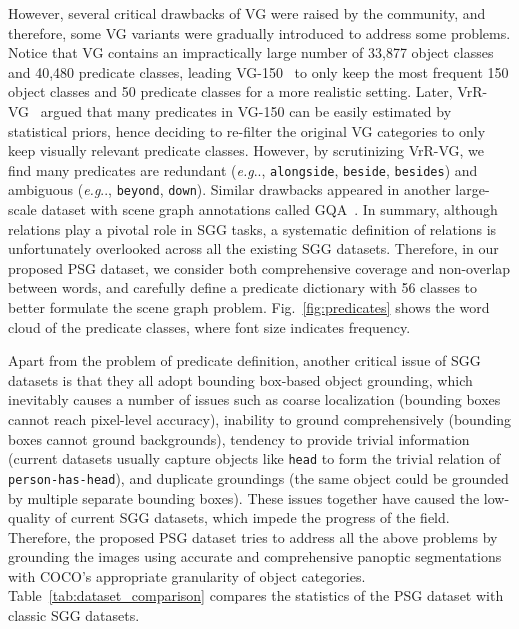 \documentclass[runningheads]{llncs}
\makeatletter
\DeclareRobustCommand\onedot{\futurelet\@let@token\@onedot}
\def\@onedot{\ifx\@let@token.\else.\null\fi\xspace}
\def\eg{\emph{e.g}\onedot} \def\Eg{\emph{E.g}\onedot}
\makeatother
\begin{document}
However, several critical drawbacks of VG were raised by the community, and therefore, some VG variants were gradually introduced to address some problems.
Notice that VG contains an impractically large number of 33,877 object classes and 40,480 predicate classes, leading VG-150~\cite{xu2017scene} to only keep the most frequent 150 object classes and 50 predicate classes for a more realistic setting. 
Later, VrR-VG~\cite{liang2019vrr} argued that many predicates in VG-150 can be easily estimated by statistical priors, hence deciding to re-filter the original VG categories to only keep visually relevant predicate classes.
However, by scrutinizing VrR-VG, we find many predicates are redundant (\eg, \texttt{alongside}, \texttt{beside}, \texttt{besides}) and ambiguous (\eg, \texttt{beyond}, \texttt{down}).
Similar drawbacks appeared in another large-scale dataset with scene graph annotations called GQA~\cite{hudson2019gqa}.
In summary, although relations play a pivotal role in SGG tasks, a systematic definition of relations is unfortunately overlooked across all the existing SGG datasets.
Therefore, in our proposed PSG dataset, we consider both comprehensive coverage and non-overlap between words, and carefully define a predicate dictionary with 56 classes to better formulate the scene graph problem. Fig.~\ref{fig:predicates} shows the word cloud of the predicate classes, where font size indicates frequency.

Apart from the problem of predicate definition, another critical issue of SGG datasets is that they all adopt bounding box-based object grounding, which inevitably causes a number of issues such as coarse localization (bounding boxes cannot reach pixel-level accuracy), inability to ground comprehensively (bounding boxes cannot ground backgrounds), tendency to provide trivial information (current datasets usually capture objects like \texttt{head} to form the trivial relation of \texttt{person-has-head}), and duplicate groundings (the same object could be grounded by multiple separate bounding boxes). These issues together have caused the low-quality of current SGG datasets, which impede the progress of the field.
Therefore, the proposed PSG dataset tries to address all the above problems by grounding the images using accurate and comprehensive panoptic segmentations with COCO's appropriate granularity of object categories.
Table~\ref{tab:dataset_comparison} compares the statistics of the PSG dataset with classic SGG datasets.
\end{document}
